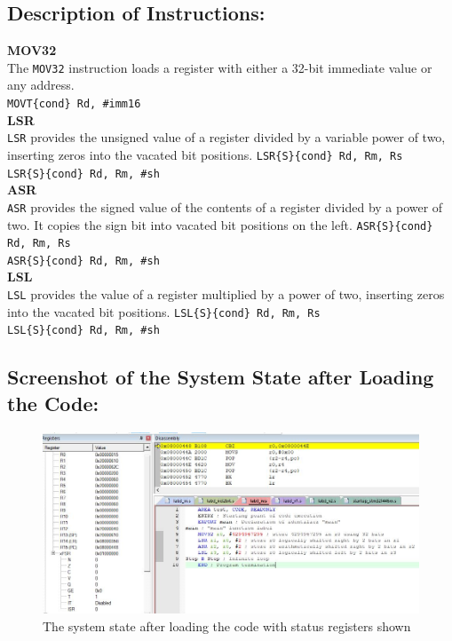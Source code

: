 \documentclass[12pt]{article}
\begin{document}
\subsection{Description of Instructions:}
\textbf{MOV32} \\ The \verb|MOV32| instruction loads a register with either a 32-bit immediate value or any address.\\
\verb|MOVT{cond} Rd, #imm16|\\
\textbf{LSR}\\
\verb|LSR| provides the unsigned value of a register divided by a variable power of two, inserting zeros into the vacated bit positions.
\verb|LSR{S}{cond} Rd, Rm, Rs|\\
\verb|LSR{S}{cond} Rd, Rm, #sh|\\
\textbf{ASR}\\
\verb|ASR| provides the signed value of the contents of a register divided by a power of two. It copies the sign bit into vacated bit positions on the left.
\verb|ASR{S}{cond} Rd, Rm, Rs|\\
\verb|ASR{S}{cond} Rd, Rm, #sh|\\
\textbf{LSL}\\
\verb|LSL| provides the value of a register multiplied by a power of two, inserting zeros into the vacated bit positions.
\verb|LSL{S}{cond} Rd, Rm, Rs|\\
\verb|LSL{S}{cond} Rd, Rm, #sh|\\
\pagebreak
\subsection{Screenshot of the System State after Loading the Code:}
\begin{figure}[ht]
    \centering
    \includegraphics[scale=.7]{images/lab3_2_ss1.jpg}
    \caption{The system state after loading the code with status registers shown}
    \label{fig:before_task_four}
\end{figure}
\pagebreak
\end{document}
